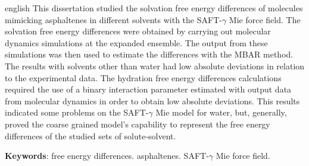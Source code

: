 \documentclass[
	12pt,				%
	openright,			%
	oneside,			%
	a4paper,			%
	english,			%
	brazil				%
	]{abntex2}
\begin{document}
\begin{resumo}[Abstract]
 \begin{otherlanguage*}{english}
  This dissertation studied the solvation free energy differences of molecules mimicking asphaltenes in different solvents with the SAFT-$\gamma$ Mie force field. The solvation free energy differences were obtained by carrying out molecular dynamics simulations at the expanded ensemble. The output from these simulations was then used to estimate the differences with the MBAR method. The results with solvents other than water had low absolute deviations in relation to the experimental data. The hydration free energy differences calculations required the use of a binary interaction parameter estimated with output data from molecular dynamics in order to obtain low absolute deviations. This results indicated some problems on the SAFT-$\gamma$ Mie model for water, but, generally, proved the coarse grained model's capability to represent the free energy differences of the studied sets of solute-solvent.

   \vspace{\onelineskip}
 
   \noindent 
   \textbf{Keywords}: free energy differences. asphaltenes. SAFT-$\gamma$ Mie force field.
 \end{otherlanguage*}
\end{resumo}

\listoffigures*
\cleardoublepage

\listoftables*
\cleardoublepage


\tableofcontents*
\cleardoublepage



\textual
\end{document}

